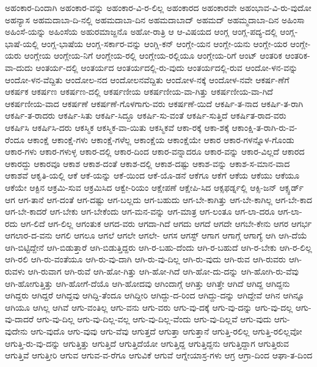 {ಅಹಂಕಾರ-ದಿಂದಾಗಿ
ಅಹಂಕಾರ-ವನ್ನು
ಅಹಂಕಾರ-ವಿ-ರ-ಲಿಲ್ಲ
ಅಹಂಕಾರದ
ಅಹಂಕಾರವೇ
ಅಹಂಭಾವ-ವಿ-ರು-ವುದೋ
ಅಹನ್ಯಾಸ
ಅಹಮದಾಬಾ-ದಿ-ನಲ್ಲಿ
ಅಹಮದಾಬಾ-ದಿನ
ಅಹಮದಾಬಾದ್
ಅಹಮದ್
ಅಹಮ್ಮದಾಬಾ-ದಿನ
ಅಹಿಂಸಾ
ಅಹಿಂಸೆ-ಯನ್ನು
ಅಹಿಂಸೆಯ
ಅಹುರಮಾಜ್ದನೊ
ಅಹೋ-ರಾತ್ರಿ
ಆ
ಆ-ವಿಷಯದ
ಆಂಗ್ಲ
ಆಂಗ್ಲ-ಪದ್ಯ-ದಲ್ಲಿ
ಆಂಗ್ಲ-ಭಾಷೆ-ಯಲ್ಲಿ
ಆಂಗ್ಲ-ಭಾಷೆಯ
ಆಂಗ್ಲ-ಸರ್ಕಾರ-ವನ್ನು
ಆಂಗ್ಲಿ-ಕನ್
ಆಂಗ್ಲೇ-ಯನ
ಆಂಗ್ಲೇ-ಯನು
ಆಂಗ್ಲೇ-ಯರ
ಆಂಗ್ಲೇ-ಯರು
ಆಂಗ್ಲೇಯ
ಆಂಗ್ಲೇಯ-ನಿಗೆ
ಆಂಗ್ಲೇಯ-ರಲ್ಲಿ
ಆಂಗ್ಲೇಯ-ರಲ್ಲಿಯೂ
ಆಂಗ್ಲೇಯ-ರಿಗೆ
ಆಂಟ್
ಆಂತರಿಕ
ಆಂತರಿಕ-ವಾ-ದುದು
ಆಂತರ್ಯ-ದಲ್ಲಿ
ಆಂತರ್ಯದ
ಆಂತರ್ಯದಲ್ಲಿ-ರು-ವುದು
ಆಂತರ್ಯದಲ್ಲಿ-ರುವ
ಆಂದೋ-ಳನ-ವನ್ನು
ಆಂದೋ-ಳನ-ವೆದ್ದಿತು
ಆಂದೋಲ-ನದ
ಆಂದೋಲನವೆದ್ದಿತು
ಆಂದೋಳ-ನಕ್ಕೆ
ಆಂದೋಳ-ನವೇ
ಆಕರ್ಷ-ಣೆಗೆ
ಆಕರ್ಷಕ
ಆಕರ್ಷಣ
ಆಕರ್ಷಣ-ದಲ್ಲಿ
ಆಕರ್ಷಣೀಯ
ಆಕರ್ಷಣೀಯ-ವಾ-ಗಿತ್ತು
ಆಕರ್ಷಣೀಯ-ವಾ-ಗಿದೆ
ಆಕರ್ಷಣೀಯ-ವಾದ
ಆಕರ್ಷಣೆ
ಆಕರ್ಷಣೆ-ಗೊಳಗಾಗು-ವರು
ಆಕರ್ಷಣೆ-ಯಿದೆ
ಆಕರ್ಷಿ-ತ-ನಾದ
ಆಕರ್ಷಿ-ತ-ರಾಗಿ
ಆಕರ್ಷಿ-ತ-ರಾದರು
ಆಕರ್ಷಿ-ಸಿತು
ಆಕರ್ಷಿ-ಸಿದ್ದೂ
ಆಕರ್ಷಿ-ಸು-ವಂತೆ
ಆಕರ್ಷಿ-ಸುತ್ತಿದೆ
ಆಕರ್ಷಿತ-ರಾದ-ವರು
ಆಕರ್ಷಿಸಿ
ಆಕರ್ಷಿಸಿ-ದರು
ಆಕಸ್ಮಿಕ
ಆಕಸ್ಮಿಕ-ವಾ-ಯಿತು
ಆಕಸ್ಮಿಕವೆ
ಆಕಾ-ರಕ್ಕೆ
ಆಕಾ-ಶಕ್ಕೆ
ಆಕಾಂಕ್ಷಿ-ತ-ರಾಗಿ-ರು-ವ-ರೆಂದೂ
ಆಕಾಂಕ್ಷೆ
ಆಕಾಂಕ್ಷೆ-ಗಳು
ಆಕಾಂಕ್ಷೆ-ಗಳೆಲ್ಲ
ಆಕಾಂಕ್ಷೆಯ
ಆಕಾಂಕ್ಷೆಯೇ
ಆಕಾರ
ಆಕಾರ-ಗಳನ್ನೊಳ-ಗೊಂಡು
ಆಕಾರ-ಗಳು
ಆಕಾರ-ಗಳುಳ್ಳ
ಆಕಾರ-ದಲ್ಲಿ
ಆಕಾರ-ದಿಂದ
ಆಕಾರ-ವನ್ನಾದರೂ
ಆಕಾರ-ವನ್ನು
ಆಕಾರ-ವಿಲ್ಲದೆ
ಆಕಾರದ
ಆಕಾರದ್ದು
ಆಕಾರವೂ
ಆಕಾಶ
ಆಕಾಶ-ದಂತೆ
ಆಕಾಶ-ದಲ್ಲಿ
ಆಕಾಶ-ದಷ್ಟು
ಆಕಾಶ-ವನ್ನು
ಆಕಾಶ-ಸ-ಮಾನ-ವಾದ
ಆಕಾಶವೆ
ಆಕೃತಿ-ಯಲ್ಲಿ
ಆಕೆ
ಆಕೆ-ಯನ್ನು
ಆಕೆ-ಯಿಂದ
ಆಕೆ-ಯೊ-ಡನೆ
ಆಕೆಗೂ
ಆಕೆಗೆ
ಆಕೆಯ
ಆಕೆಯು
ಆಕೆಯೂ
ಆಕೆಯೇ
ಆಕ್ಟಿನ
ಆಕ್ರಮಿ-ಸುವ
ಆಕ್ರಮಿಸಿದ
ಆಕ್ವೇ-ರಿಯಂ
ಆಕ್ಷೇಪಣೆ
ಆಕ್ಷೇಪಿ-ಸಿದ
ಆಕ್ಸಫರ್ಡ್ನಲ್ಲಿ
ಆಕ್ಸಿ-ಜನ್
ಆಕ್ಸ್ಫರ್ಡ್
ಆಗ
ಆಗ-ತಾನೆ
ಆಗ-ದಂತೆ
ಆಗ-ದಷ್ಟು
ಆಗ-ಬಲ್ಲದು
ಆಗ-ಬಹುದು
ಆಗ-ಬೇ-ಕಾಗಿತ್ತು
ಆಗ-ಬೇ-ಕಾಗಿಲ್ಲ
ಆಗ-ಬೇ-ಕಾದ
ಆಗ-ಬೇ-ಕಾದರೆ
ಆಗ-ಬೇಕು
ಆಗ-ಬೇಕೆಂದು
ಆಗ-ಮನ-ವನ್ನು
ಆಗ-ಮಾತ್ರ
ಆಗ-ಲಂತೂ
ಆಗ-ಲಾ-ದರೂ
ಆಗ-ಲಾ-ರದು
ಆಗ-ಲಿದೆ
ಆಗ-ಲಿಲ್ಲ
ಆಗಂತುಕ
ಆಗದ-ವರು
ಆಗದಾ-ಗಿದೆ
ಆಗದು
ಆಗದೆ
ಆಗದೇ
ಆಗಬೇ-ಕೇನು
ಆಗರ
ಆಗರ್ಭ
ಆಗಲಾರ-ದ-ವನು
ಆಗಲಿ
ಆಗಲೂ
ಆಗಲೆ
ಆಗಲೇ
ಆಗಲೇ-
ಆಗಸ
ಆಗಸ್ಟ್
ಆಗಾಗ
ಆಗಾಗ್ಗೆ
ಆಗಾಗ್ಯೆ
ಆಗಿ
ಆಗಿ-ದೆಯೆ
ಆಗಿ-ಬಿಟ್ಟಿದ್ದೇನೆ
ಆಗಿ-ಬಿಡುತ್ತಾರೆ
ಆಗಿ-ಬಿಡುತ್ತಿದ್ದರು
ಆಗಿ-ರ-ಬಹು-ದೆಂದು
ಆಗಿ-ರ-ಬಹುದೆ
ಆಗಿ-ರ-ಬೇಕು
ಆಗಿ-ರ-ಲಿಲ್ಲ
ಆಗಿ-ರಲಿ
ಆಗಿ-ರು-ವಂತೆಯೂ
ಆಗಿ-ರು-ವು-ದಾಗಿ
ಆಗಿ-ರು-ವು-ದಿಲ್ಲ
ಆಗಿ-ರು-ವುದು
ಆಗಿ-ರುವ
ಆಗಿ-ರುವರು
ಆಗಿ-ರುವಳು
ಆಗಿ-ರುವಾಗ
ಆಗಿ-ರುವೆ
ಆಗಿ-ಹೋ-ಗಿತ್ತು
ಆಗಿ-ಹೋ-ಗಿದೆ
ಆಗಿ-ಹೋ-ದು-ದನ್ನು
ಆಗಿ-ಹೋಗಿ-ರು-ವೆವು
ಆಗಿ-ಹೋಗುತ್ತಿತ್ತು
ಆಗಿ-ಹೋಗೆ-ದೆಯೊ
ಆಗಿ-ಹೋದವು
ಆಗಿಂದಾಗ್ಗೆ
ಆಗಿತ್ತು
ಆಗಿತ್ತೇ
ಆಗಿದೆ
ಆಗಿದ್ದ
ಆಗಿದ್ದನು
ಆಗಿದ್ದರು
ಆಗಿದ್ದರೆ
ಆಗಿದ್ದವು
ಆಗಿದ್ದಿ-ತೆಂದೂ
ಆಗಿದ್ದೀರಿ
ಆಗಿದ್ದು-ದ-ರಿಂದ
ಆಗಿದ್ದು-ದನ್ನು
ಆಗಿದ್ದೇವೆ
ಆಗಿನ
ಆಗಿನ್ನೂ
ಆಗಿಯೂ
ಆಗಿಲ್ಲ
ಆಗಿವೆ
ಆಗು-ವಂತಿಲ್ಲ
ಆಗು-ವನು
ಆಗು-ವರು
ಆಗು-ವು-ದಕ್ಕೆ
ಆಗು-ವು-ದನ್ನು
ಆಗು-ವು-ದಲ್ಲ
ಆಗು-ವು-ದಾದರೆ
ಆಗು-ವು-ದಿಲ್ಲ
ಆಗು-ವು-ದಿಲ್ಲ-ವಲ್ಲ
ಆಗು-ವು-ದಿಲ್ಲ-ವೆಂದು
ಆಗು-ವು-ದಿಲ್ಲವೆ
ಆಗು-ವುದು
ಆಗು-ವುದೇನು
ಆಗು-ವುದೊ
ಆಗು-ವುವು
ಆಗು-ವೆವು
ಆಗುತ್ತದೆ
ಆಗುತ್ತಾ
ಆಗುತ್ತಾನೆ
ಆಗುತ್ತಿ-ರಲಿಲ್ಲ
ಆಗುತ್ತಿ-ರಲಿಲ್ಲವೋ
ಆಗುತ್ತಿ-ರು-ವು-ದನ್ನು
ಆಗುತ್ತಿತ್ತು
ಆಗುತ್ತಿದೆ
ಆಗುತ್ತಿದೆಯೋ
ಆಗುತ್ತಿದ್ದ
ಆಗುತ್ತಿದ್ದನು
ಆಗುತ್ತಿದ್ದಾಗ
ಆಗುತ್ತಿರುವ
ಆಗುತ್ತಿವೆ
ಆಗುತ್ತೀರಿ
ಆಗುವ
ಆಗುವ-ವ-ರೆಗೂ
ಆಗುವಿಕೆ
ಆಗುವೆ
ಆಗ್ನೇಯಾಸ್ರ-ಗಳು
ಆಗ್ರ
ಆಗ್ರಾ-ದಿಂದ
ಆಘಾ-ತ-ದಿಂದ
}
